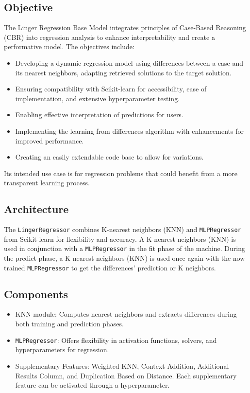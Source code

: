 \documentclass[a4paper, 12pt]{report}
\begin{document}
\subsection{Objective}
The Linger Regression Base Model integrates principles of Case-Based Reasoning (CBR) into regression analysis to enhance interpretability and create a performative model. The objectives include:

\begin{itemize}
    \item Developing a dynamic regression model using differences between a case and its nearest neighbors, adapting retrieved solutions to the target solution.
    \item Ensuring compatibility with Scikit-learn for accessibility, ease of implementation, and extensive hyperparameter testing.
    \item Enabling effective interpretation of predictions for users.
    \item Implementing the learning from differences algorithm with enhancements for improved performance.
    \item Creating an easily extendable code base to allow for variations.
\end{itemize}

Its intended use case is for regression problems that could benefit from a more transparent learning process.

\subsection{Architecture}
The \texttt{LingerRegressor} combines K-nearest neighbors (KNN) and \texttt{MLPRegressor} from Scikit-learn for flexibility and accuracy. A K-nearest neighbors (KNN) is used in conjunction with a \texttt{MLPRegressor} in the fit phase of the machine. 
During the predict phase, a K-nearest neighbors (KNN) is used once again with the now trained \texttt{MLPRegressor} to get the differences' prediction or K neighbors.

\subsection{Components}
\begin{itemize}
    \item KNN module: Computes nearest neighbors and extracts differences during both training and prediction phases.
    \item \texttt{MLPRegressor}: Offers flexibility in activation functions, solvers, and hyperparameters for regression.
    \item Supplementary Features: Weighted KNN, Context Addition, Additional Results Column, and Duplication Based on Distance.
     Each supplementary feature can be activated through a hyperparameter.
\end{itemize}
\end{document}
